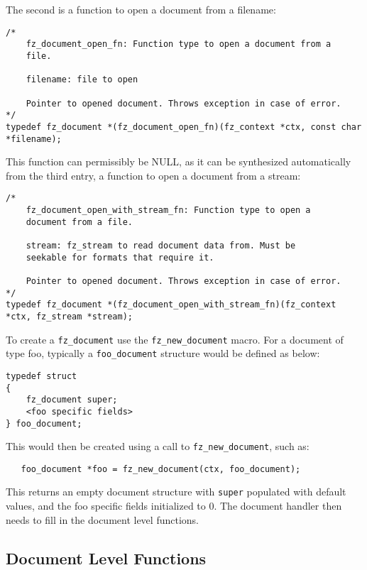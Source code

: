 \documentclass[oneside]{book}
\begin{document}
The second is a function to open a document from a filename:

\begin{lstlisting}
/*
	fz_document_open_fn: Function type to open a document from a
	file.

	filename: file to open

	Pointer to opened document. Throws exception in case of error.
*/
typedef fz_document *(fz_document_open_fn)(fz_context *ctx, const char *filename);
\end{lstlisting}

This function can permissibly be NULL, as it can be synthesized automatically from the third entry, a function to open a document from a stream:

\begin{lstlisting}
/*
	fz_document_open_with_stream_fn: Function type to open a
	document from a file.

	stream: fz_stream to read document data from. Must be
	seekable for formats that require it.

	Pointer to opened document. Throws exception in case of error.
*/
typedef fz_document *(fz_document_open_with_stream_fn)(fz_context *ctx, fz_stream *stream);
\end{lstlisting}

To create a \texttt{fz\_document} use the \texttt{fz\_new\_document} macro. For a document of type foo, typically a \texttt{foo\_document} structure would be defined as below:

\begin{lstlisting}
typedef struct
{
	fz_document super;
	<foo specific fields>
} foo_document;
\end{lstlisting}

This would then be created using a call to \texttt{fz\_new\_document}, such as:

\begin{lstlisting}
   foo_document *foo = fz_new_document(ctx, foo_document);
\end{lstlisting}

This returns an empty document structure with \texttt{super} populated with default values, and the foo specific fields initialized to 0. The document handler then needs to fill in the document level functions.

\subsection{Document Level Functions}
\end{document}
